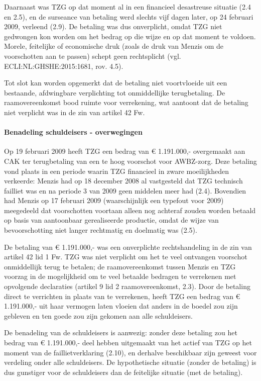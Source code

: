\documentclass[
  dutch,
  a4paper,
]{article}
\begin{document}
Daarnaast was TZG op dat moment al in een financieel desastreuse situatie (2.4 en 2.5), en de surseance van betaling werd slechts vijf dagen later, op 24 februari 2009, verleend (2.9). De betaling was dus onverplicht, omdat TZG niet gedwongen kon worden om het bedrag op die wijze en op dat moment te voldoen. Morele, feitelijke of economische druk (zoals de druk van Menzis om de voorschotten aan te passen) schept geen rechtsplicht (vgl. ECLI:NL:GHSHE:2015:1681, rov. 4.5).

Tot slot kan worden opgemerkt dat de betaling niet voortvloeide uit een bestaande, afdwingbare verplichting tot onmiddellijke terugbetaling. De raamovereenkomst bood ruimte voor verrekening, wat aantoont dat de betaling niet verplicht was in de zin van artikel 42 Fw.

\paragraph{Benadeling schuldeisers - overwegingen}\label{benadeling-schuldeisers---overwegingen-84}

Op 19 februari 2009 heeft TZG een bedrag van € 1.191.000,- overgemaakt aan CAK ter terugbetaling van een te hoog voorschot voor AWBZ-zorg. Deze betaling vond plaats in een periode waarin TZG financieel in zware moeilijkheden verkeerde: Menzis had op 18 december 2008 al vastgesteld dat TZG technisch failliet was en na periode 3 van 2009 geen middelen meer had (2.4). Bovendien had Menzis op 17 februari 2009 (waarschijnlijk een typefout voor 2009) meegedeeld dat voorschotten voortaan alleen nog achteraf zouden worden betaald op basis van aantoonbaar gerealiseerde productie, omdat de wijze van bevoorschotting niet langer rechtmatig en doelmatig was (2.5).

De betaling van € 1.191.000,- was een onverplichte rechtshandeling in de zin van artikel 42 lid 1 Fw. TZG was niet verplicht om het te veel ontvangen voorschot onmiddellijk terug te betalen; de raamovereenkomst tussen Menzis en TZG voorzag in de mogelijkheid om te veel betaalde bedragen te verrekenen met opvolgende declaraties (artikel 9 lid 2 raamovereenkomst, 2.3). Door de betaling direct te verrichten in plaats van te verrekenen, heeft TZG een bedrag van € 1.191.000,- uit haar vermogen laten vloeien dat anders in de boedel zou zijn gebleven en ten goede zou zijn gekomen aan alle schuldeisers.

De benadeling van de schuldeisers is aanwezig: zonder deze betaling zou het bedrag van € 1.191.000,- deel hebben uitgemaakt van het actief van TZG op het moment van de faillietverklaring (2.10), en derhalve beschikbaar zijn geweest voor verdeling onder alle schuldeisers. De hypothetische situatie (zonder de betaling) is dus gunstiger voor de schuldeisers dan de feitelijke situatie (met de betaling).
\end{document}
